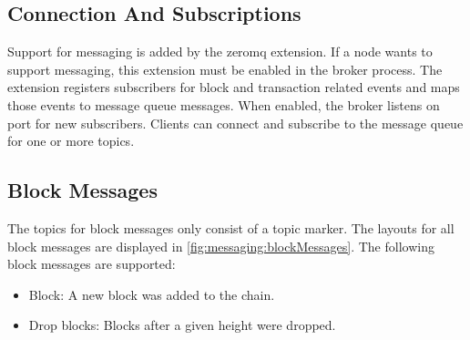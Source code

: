 \subsection{Connection And Subscriptions}
\label{sec:messaging:messages}

Support for messaging is added by the zeromq extension.
If a node wants to support messaging, this extension must be enabled in the broker process.
The extension registers subscribers for block and transaction related events  and maps those events to message queue messages.
When enabled, the broker listens on port  for new subscribers.
Clients can connect and subscribe to the message queue for one or more topics.

\subsection{Block Messages}

The topics for block messages only consist of a topic marker.
The layouts for all block messages are displayed in \autoref{fig:messaging:blockMessages}.
The following block messages are supported:

\begin{itemize}
	\item{Block: A new block was added to the chain.}
	\item{Drop blocks: Blocks after a given height were dropped.}
\end{itemize}

\begin{figure}[H]
	\label{fig:messaging:blockMessages}
\end{figure}


